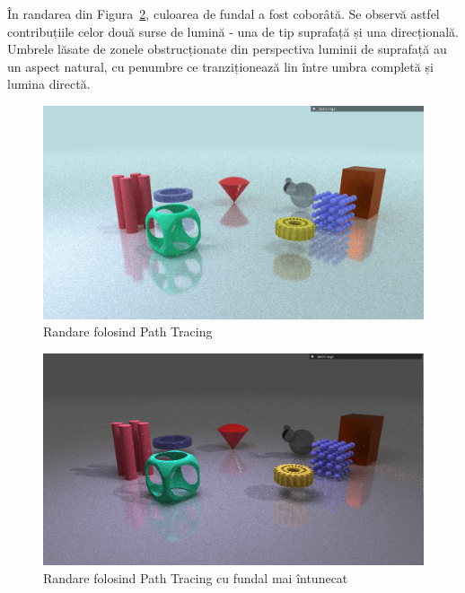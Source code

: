 \documentclass[12pt,a4paper]{report}
\numberwithin{equation}{section} %
\begin{document}
În randarea din Figura~\ref{fig:demo_pathtracing2},
culoarea de fundal a fost coborâtă. Se observă astfel contribuțiile celor două surse
de lumină - una de tip suprafață și una direcțională. Umbrele lăsate de zonele
obstrucționate din perspectiva luminii de suprafață au un aspect natural, cu penumbre
ce tranziționează lin între umbra completă și lumina directă.
\begin{figure}[!htb]
	\centering
	\includegraphics[width=\textwidth]{pics/demo_pathtracing.png}
	\caption{Randare folosind Path Tracing}
	\label{fig:demo_pathtracing}
\end{figure}
\begin{figure}[!htb]
	\centering
	\includegraphics[width=\textwidth]{pics/demo_pathtracing2.png}
	\caption{Randare folosind Path Tracing cu fundal mai întunecat}
	\label{fig:demo_pathtracing2}
\end{figure}
\end{document}
